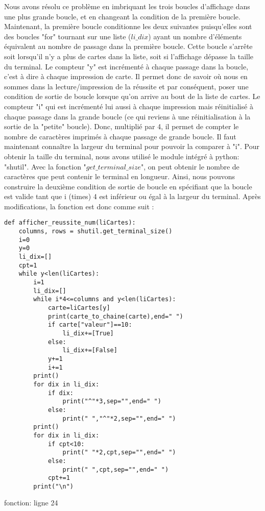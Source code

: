 \documentclass[10pt,a4paper,french,titlepage]{article}
\begin{document}
Nous avons résolu ce problème en imbriquant les trois boucles d'affichage dans une plus grande boucle, et en changeant la condition de la première boucle. Maintenant, la première boucle conditionne les deux suivantes puisqu'elles sont des boucles "for" tournant sur une liste ($li\_dix$) ayant un nombre  d'éléments équivalent au nombre de passage dans la première boucle. Cette boucle s'arrête soit lorsqu'il n'y a plus de cartes dans la liste, soit si l'affichage dépasse la taille du terminal. Le compteur "y" est incrémenté à chaque passage dans la boucle, c'est à dire à chaque impression de carte. Il permet donc de savoir où nous en sommes dans la lecture/impression de la réussite et par conséquent, poser une condition de sortie de boucle lorsque qu'on arrive au bout de la liste de cartes. Le compteur "i" qui est incrémenté lui aussi à chaque impression mais réinitialisé à chaque passage dans la grande  boucle (ce qui reviens à une réinitialisation à la sortie de la "petite" boucle). Donc, multiplié par 4, il permet de compter le nombre de caractères imprimés à chaque passage de grande boucle. Il faut maintenant connaître la largeur du terminal pour pouvoir la comparer à "i". Pour obtenir la taille du terminal, nous avons utilisé le module intégré à python: "shutil". Avec la fonction "$get\_terminal\_size$", on peut obtenir le nombre de caractères que peut  contenir le terminal en longueur. Ainsi, nous pouvons construire la deuxième condition de sortie de boucle en spécifiant que la boucle est valide tant que i (times) 4 est inférieur ou égal à la largeur du terminal. Après modifications, la fonction est donc comme suit :

\begin{lstlisting}
def afficher_reussite_num(liCartes):
    columns, rows = shutil.get_terminal_size()
    i=0
    y=0
    li_dix=[]
    cpt=1
    while y<len(liCartes):
        i=1
        li_dix=[]
        while i*4<=columns and y<len(liCartes): 
            carte=liCartes[y]
            print(carte_to_chaine(carte),end=" ")
            if carte["valeur"]==10:
                li_dix+=[True]
            else:
                li_dix+=[False]
            y+=1
            i+=1
        print()
        for dix in li_dix:
            if dix:
                print("^"*3,sep="",end=" ")
            else:
                print(" ","^"*2,sep="",end=" ")
        print()
        for dix in li_dix:
            if cpt<10:
                print(" "*2,cpt,sep="",end=" ")
            else:
                print(" ",cpt,sep="",end=" ")
            cpt+=1
        print("\n")
\end{lstlisting}
\caption{fonction: ligne 24}
\end{document}
